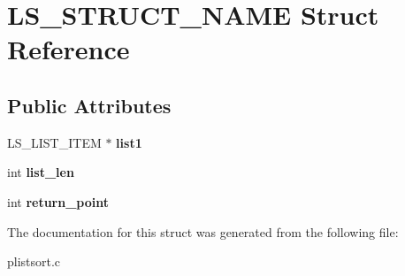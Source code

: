 \hypertarget{structLS__STRUCT__NAME}{}\section{L\+S\+\_\+\+S\+T\+R\+U\+C\+T\+\_\+\+N\+A\+ME Struct Reference}
\label{structLS__STRUCT__NAME}
\subsection*{Public Attributes}
\begin{DoxyCompactItemize}
\item 
\mbox{\label{structLS__STRUCT__NAME_a3816f4e9d85309003a20015cbdc7df6b}} 
L\+S\+\_\+\+L\+I\+S\+T\+\_\+\+I\+T\+EM $\ast$ {\bfseries list1}
\item 
\mbox{\label{structLS__STRUCT__NAME_afa491a2d53e73d05016061c2ff368782}} 
int {\bfseries list\+\_\+len}
\item 
\mbox{\label{structLS__STRUCT__NAME_adf8e6a23f93115c4f2492198692c46ee}} 
int {\bfseries return\+\_\+point}
\end{DoxyCompactItemize}


The documentation for this struct was generated from the following file\+:\begin{DoxyCompactItemize}
\item 
plistsort.\+c\end{DoxyCompactItemize}
